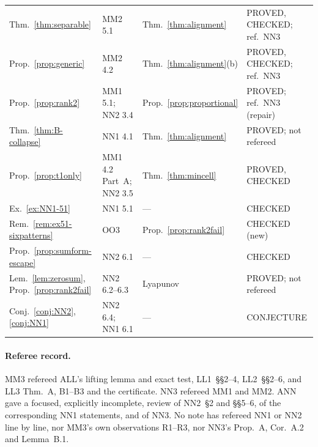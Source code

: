 \documentclass[11pt]{article}
\theoremstyle{definition}
\theoremstyle{remark}
\newcommand{\src}[1]{\textsf{#1}}
\begin{document}
{\begin{longtable}{>{\raggedright}p{}>{\raggedright}p{}>{\raggedright}p{}>{\raggedright\arraybackslash}p{}}
Thm.~\ref{thm:separable} & MM2 5.1 & Thm.~\ref{thm:alignment} & PROVED, CHECKED; ref.\ NN3 \\
Prop.~\ref{prop:generic} & MM2 4.2 & Thm.~\ref{thm:alignment}(b) & PROVED, CHECKED; ref.\ NN3 \\
Prop.~\ref{prop:rank2} & MM1 5.1; NN2 3.4 & Prop.~\ref{prop:proportional} & PROVED; ref.\ NN3 (repair) \\
Thm.~\ref{thm:B-collapse} & NN1 4.1 & Thm.~\ref{thm:alignment} & PROVED; not refereed \\
Prop.~\ref{prop:t1only} & MM1 4.2 Part~A; NN2 3.5 & Thm.~\ref{thm:mincell} & PROVED, CHECKED \\
Ex.~\ref{ex:NN1-51} & NN1 5.1 & --- & CHECKED \\
Rem.~\ref{rem:ex51-sixpatterns} & OO3 & Prop.~\ref{prop:rank2fail} & CHECKED (new) \\
Prop.~\ref{prop:sumform-escape} & NN2 6.1 & --- & CHECKED \\
Lem.~\ref{lem:zerosum}, Prop.~\ref{prop:rank2fail} & NN2 6.2--6.3 & Lyapunov & PROVED; not refereed \\
Conj.~\ref{conj:NN2}, \ref{conj:NN1} & NN2 6.4; NN1 6.1 & --- & CONJECTURE \\
\bottomrule
\end{longtable}
}

\paragraph{Referee record.} \src{MM3} refereed \src{ALL}'s lifting lemma and exact test, \src{LL1}~\S\S2--4, \src{LL2}~\S\S2--6, and \src{LL3} Thm.~A, B1--B3 and the certificate. \src{NN3} refereed \src{MM1} and \src{MM2}. \src{ANN} gave a focused, explicitly incomplete, review of \src{NN2}~\S2 and \S\S5--6, of the corresponding \src{NN1} statements, and of \src{NN3}. No note has refereed \src{NN1} or \src{NN2} line by line, nor \src{MM3}'s own observations R1--R3, nor \src{NN3}'s Prop.~A, Cor.~A.2 and Lemma~B.1.
\end{document}
